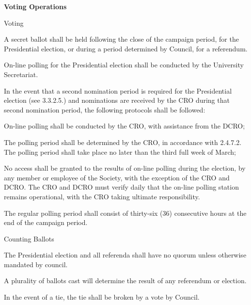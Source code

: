\begin{longenum}[ label*=\thesection.\arabic*., align=left]
 \item 	\textbf{Voting Operations}
\begin{longenum}[label*=\arabic*., align=left]
\item Voting
	\begin{longenum}[label*=\arabic*., align=left]
	\item A secret ballot shall be held following the close of the campaign period, for the Presidential election, or during a period determined by Council, for a referendum.
		\begin{longenum}[label*=\arabic*., align=left]
		\item On-line polling for the Presidential election shall be conducted by the University Secretariat.
		\item In the event that a second nomination period is required for the Presidential election (see 3.3.2.5.) and nominations are received by the CRO during that second nomination period, the following protocols shall be followed:
			\begin{longenum}[label*=\arabic*., align=left]
			\item On-line polling shall be conducted by the CRO, with assistance from the DCRO;
			\item The polling period shall be determined by the CRO, in accordance with 2.4.7.2. The polling period shall take place no later than the third full week of March;
			\item No access shall be granted to the results of on-line polling during the election, by any member or employee of the Society, with the exception of the CRO and DCRO. The CRO and DCRO must verify daily that the on-line polling station remains operational, with the CRO taking ultimate responsibility.
			\end{longenum}
		\end{longenum}
	\item The regular polling period shall consist of thirty-six (36) consecutive hours at the end of the campaign period.
	\end{longenum}		

\item Counting Ballots
	\begin{longenum}[label*=\arabic*., align=left]
	\item The Presidential election and all referenda shall have no quorum unless otherwise mandated by council.
	\item A plurality of ballots cast will determine the result of any referendum or election.
	\item In the event of a tie, the tie shall be broken by a vote by Council.
	\end{longenum}
\end{longenum}



\end{longenum}
